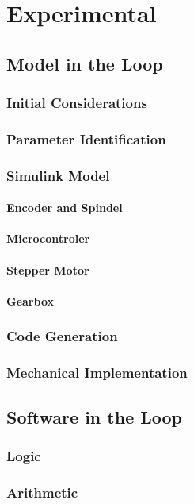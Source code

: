 \chapter{Experimental}
\label{experimental}
\section{Model in the Loop}
\subsection{Initial Considerations}
\subsection{Parameter Identification}
\subsection{Simulink Model}
\subsubsection{Encoder and Spindel}
\subsubsection{Microcontroler}
\subsubsection{Stepper Motor}
\subsubsection{Gearbox}
\subsection{Code Generation}
\subsection{Mechanical Implementation}

\section{Software in the Loop}
\subsection{Logic}
\subsection{Arithmetic}

